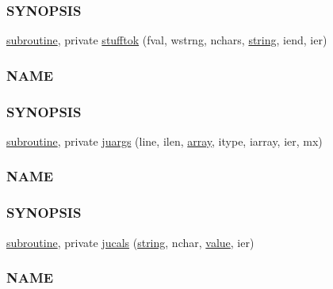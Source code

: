 \begin{DoxyCompactItemize}
\begin{DoxyCompactList}
\subsubsection*{S\+Y\+N\+O\+P\+S\+IS}\end{DoxyCompactList}\item 
\hyperlink{M__stopwatch_83_8txt_acfbcff50169d691ff02d4a123ed70482}{subroutine}, private \hyperlink{namespacem__calculator_ae4cc2211f8bd276d5765e4ebc9d6e354}{stufftok} (fval, wstrng, nchars, \hyperlink{what__overview_81_8txt_a74cb7e955273b9f9157b4f0c18a38849}{string}, iend, ier)
\begin{DoxyCompactList}\small\item\em \subsubsection*{N\+A\+ME}

\subsubsection*{S\+Y\+N\+O\+P\+S\+IS}\end{DoxyCompactList}\item 
\hyperlink{M__stopwatch_83_8txt_acfbcff50169d691ff02d4a123ed70482}{subroutine}, private \hyperlink{namespacem__calculator_a6fc04e994f45d649d5e412e0013bf127}{juargs} (line, ilen, \hyperlink{intro__blas1_83_8txt_a89db1945e1a335ab0184c6a097821e32}{array}, itype, iarray, ier, mx)
\begin{DoxyCompactList}\small\item\em \subsubsection*{N\+A\+ME}

\subsubsection*{S\+Y\+N\+O\+P\+S\+IS}\end{DoxyCompactList}\item 
\hyperlink{M__stopwatch_83_8txt_acfbcff50169d691ff02d4a123ed70482}{subroutine}, private \hyperlink{namespacem__calculator_a1461bad85da11d09210daefe3f80973d}{jucals} (\hyperlink{what__overview_81_8txt_a74cb7e955273b9f9157b4f0c18a38849}{string}, nchar, \hyperlink{namespacem__calculator_aeaff519ae0f18ac99095c955fbe12f9d}{value}, ier)
\begin{DoxyCompactList}\small\item\em \subsubsection*{N\+A\+ME}


\end{DoxyCompactList}
\end{DoxyCompactItemize}
